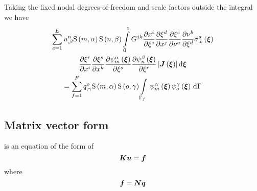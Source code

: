 Taking the fixed nodal degrees-of-freedom and scale factors outside the integral we have
\begin{multline}
  \dsum_{e=1}^{E}\nodedof{u}{n}{\beta}\gsf{m}{\alpha}\gsf{n}{\beta}
  \dintl{\vectr{0}}{\vectr{1}}G^{jk}\delby{x^{i}}{\xi^{c}}
  \delby{\xi^{d}}{x^{j}}\delby{\xi^{c}}{\nu^{a}}
  \delby{\nu^{b}}{\xi^{d}}\fnof{{\tilde{\sigma}}^{a}_{.b}}{\vectr{\xi}} \\
  \delby{\xi^{r}}{x^{i}}\delby{\xi^{s}}{x^{k}}
  \delby{\gbfn{m}{\alpha}{\vectr{\xi}}}{\xi^{s}}
  \delby{\gbfn{n}{\beta}{\vectr{\xi}}}{\xi^{r}}
  \abs{\fnof{\matr{J}}{\vectr{\xi}}}\exteriorderiv{\vectr{\xi}} \\
  = \dsum_{f=1}^{F}\nodedof{q}{o}{\gamma}\gsf{m}{\alpha}\gsf{o}{\gamma}
  \gint{\Gamma_{f}}{}{\gbfn{m}{\alpha}{\vectr{\xi}}\gbfn{o}{\gamma}{\vectr{\xi}}}{\Gamma}
  \label{eqn:elementalfem1}
\end{multline}

\subsection{Matrix vector form}

 is an equation of the form of
\begin{equation}
  \matr{K}\vect{u}=\vect{f}
\end{equation}
where
\begin{equation}
  \vectr{f}=\matr{N}\vectr{q}
\end{equation}

